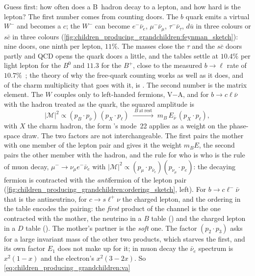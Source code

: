 Guess first: how often does a B~hadron decay to a lepton, and how hard is
the lepton? The first number comes from counting doors. The $b$ quark
emits a virtual $W^-$ and becomes a $c$; the $W^-$ can become $e^-\bar\nu_e$,
$\mu^-\bar\nu_\mu$, $\tau^-\bar\nu_\tau$, $d\bar u$ in three colours or
$s\bar c$ in three colours
(\cref{fig:children_producing_grandchildren:feynman_sketch}): nine doors,
one ninth per lepton, $11\%$. The masses close the $\tau$ and the $s\bar c$
doors partly and QCD opens the quark doors a little, and the tables
settle at $10.4\%$ per light lepton for the $B^0$ and $11.3$ for the $B^+$,
close to the measured $b\to\ell$ rate of $10.7\%$~\cite{HeavyFlavorAveragingGroupHFLAV:2024ctg};
the theory of why the free-quark counting works as well as it does, and
of the charm multiplicity that goes with it, is \cite{Bigi:1992su,Neubert:1996we,Lenz:2014jha}.
The second number is the matrix element. The $W$ couples only to
left-handed fermions, V$-$A, and for $b\to c\ell\bar\nu$ with the hadron
treated as the quark, the squared amplitude is
\begin{equation}
  |\mathcal M|^2\propto(p_B\cdot p_{\bar\nu})\,(p_X\cdot p_\ell)
  \;\xrightarrow{\;B\ \mathrm{at\ rest}\;}\;m_B\,E_{\bar\nu}\,(p_X\cdot p_\ell),
  \label{eq:children_producing_grandchildren:va}
\end{equation}
with $X$ the charm hadron, the form \PYTHIA's mode~22 applies as a weight
on the phase-space draw. The two factors are not interchangeable. The
first pairs the mother with one member of the lepton pair and gives it
the weight $m_B E$, the second pairs the other member with the hadron,
and the rule for who is who is the rule of muon decay,
$\mu^-\to\nu_\mu e^-\bar\nu_e$ with
$|\mathcal M|^2\propto(p_\mu\cdot p_{\bar\nu_e})(p_{\nu_\mu}\cdot p_e)$:
the decaying fermion is contracted with the \emph{anti}fermion of the
lepton pair (\cref{fig:children_producing_grandchildren:ordering_sketch},
left). For $b\to c\ell^-\bar\nu$ that is the antineutrino, for
$c\to s\ell^+\nu$ the charged lepton, and the ordering in the table
encodes the pairing: the \emph{first} product of the channel is the one
contracted with the mother, the neutrino in a $B$ table
() and the charged lepton in a $D$ table
(). The mother's partner is the \emph{soft} one. The
factor $(p_2\cdot p_3)$ asks for a large invariant mass of the other two
products, which starves the first, and its own factor $E_1$ does not make
up for it; in muon decay the $\bar\nu_e$ spectrum is $x^2(1-x)$ and the
electron's $x^2(3-2x)$. So \cref{eq:children_producing_grandchildren:va}
